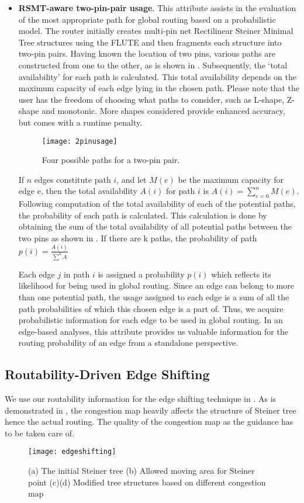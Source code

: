 \begin{itemize}
\item \textbf{RSMT-aware two-pin-pair usage}. This attribute assists in the evaluation of the most appropriate path for global routing based on a probabilistic model. The router initially creates multi-pin net Rectilinear Steiner Minimal Tree structures using the FLUTE \cite{FLUTE} and then fragments each structure into two-pin pairs. Having known the location of two pins, various paths are constructed from one to the other, as is shown in . Subsequently, the ‘total availability’ for each path is calculated. This total availability depends on the maximum capacity of each edge lying in the chosen path. Please note that the user has the freedom of choosing what paths to consider, such as L-shape, Z-shape and monotonic. More shapes considered provide enhanced accuracy, but comes with a runtime penalty.

\begin{figure}[tbh!]
    \centering
    \texttt{[image: 2pinusage]}
    \caption{Four possible paths for a two-pin pair.}
    \label{fig:2pinusage}
\end{figure}

If $n$ edges constitute path $i$, and let $M(e)$ be the maximum capacity for edge e, then the total availability $A(i)$ for path $i$ is $A(i)=\sum_{e=0}^{n}M(e)$. Following computation of the total availability of each of the potential paths, the probability of each path is calculated. This calculation is done by obtaining the sum of the total availability of all potential paths between the two pins as shown in .
If there are k paths, the probability of path $p(i)=\frac{A(i)}{\sum^{k}A}$

Each edge $j$ in path $i$ is assigned a probability $p(i)$ which reflects its likelihood for being used in global routing. Since an edge can belong to more than one potential path, the usage assigned to each edge is a sum of all the path probabilities of which this chosen edge is a part of. Thus, we acquire probabilistic information for each edge to be used in global routing. In an edge-based analyses, this attribute provides us valuable information for the routing probability of an edge from a standalone perspective.
\end{itemize}

\subsection{Routability-Driven Edge Shifting}
We use our routability information for the edge shifting technique in \cite{fastroute}. As is demonstrated in , the congestion map heavily affects the structure of Steiner tree hence the actual routing. The quality of the congestion map as the guidance has to be taken care of.
\begin{figure}[htbp]
    \centerline{\texttt{[image: edgeshifting]}}
    \caption{(a) The initial Steiner tree (b) Allowed moving area for Steiner point (c)(d) Modified tree structures based on different congestion map}
    \label{fig:edgeshifting}
\end{figure}


